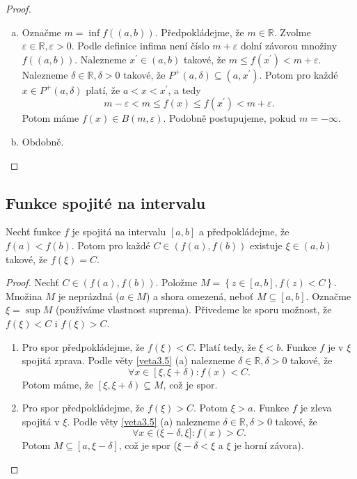 \begin{proof}\,
\begin{enumerate}[(a)]
	\item Označme $m=\inf f((a,b))$. Předpokládejme, že $m\in \mathbb R $. Zvolme $\varepsilon \in \mathbb R , \varepsilon > 0$.
	Podle definice infima není číslo $m+\varepsilon$ dolní závorou množiny $f((a,b))$. Nalezneme $x^\prime \in (a,b)$
	takové, že $m\leq f(x^\prime)< m + \varepsilon$. Nalezneme $\delta \in \mathbb R , \delta  > 0$ takové, že
	$P^+(a,\delta)\subseteq (a,x^\prime).$ Potom pro každé $x\in P^+(a,\delta)$ platí, že $a<x<x^\prime$, a tedy
	$$
	    m-\varepsilon < m \leq f(x) \leq f(x^\prime) < m+ \varepsilon.
	$$
	Potom máme $f(x)\in B(m,\varepsilon)$. Podobně postupujeme, pokud $m=-\infty$.
	\item Obdobně.\qedhere
\end{enumerate}
\end{proof}

\subsection{Funkce spojité na intervalu}
\begin{veta}[Bolzano]\label{veta3.10}
Nechť funkce $f$ je spojitá na intervalu $[a,b]$ a předpokládejme, že $f(a)<f(b)$. Potom pro každé $C\in (f(a),f(b))$ existuje $\xi\in(a,b)$ takové, že $f(\xi)=C$.
\end{veta}

\begin{proof}
	Nechť $C\in (f(a),f(b)).$ Položme $M = \left \{ z\in \left [ a,b \right ] , f(z)< C \right \} $.
	Množina $M$ je neprázdná ($a \in M$) a shora omezená, neboť $M \subseteq \left [ a,b \right ] $.
	Označme $\xi=\sup M$ (používáme vlastnost suprema). Přivedeme ke sporu možnost, že $f(\xi) < C$ i
	$f(\xi) > C$.
	\begin{enumerate}[($i$)]
		\item Pro spor předpokládejme, že $f(\xi)<C$. Platí tedy, že $\xi < b$. Funkce $f$ je v
		$\xi$ spojitá zprava. Podle věty \ref{veta3.5} (a) nalezneme $\delta \in \mathbb R ,\delta > 0$
		takové, že
		$$
		    \forall x \in \left [ \xi,\xi+\delta \right ):f(x)< C.
		$$
		Potom máme, že $\left [ \xi, \xi+ \delta \right ) \subseteq M $, což je spor.
		\item Pro spor předpokládejme, že $f(\xi) > C$. Potom $\xi > a$. Funkce $f$ je zleva spojitá
		v $\xi$. Podle věty \ref{veta3.5} (a) nalezneme $\delta \in \mathbb R , \delta > 0$
		takové, že
		$$\forall x \in (\xi-\delta, \xi]:f(x)>C.$$
		Potom $M\subseteq \left [ a,\xi-\delta \right ] $, což je spor ($\xi-\delta <\xi$  a $ \xi$ je
		horní závora).\qedhere
	\end{enumerate}
\end{proof}


